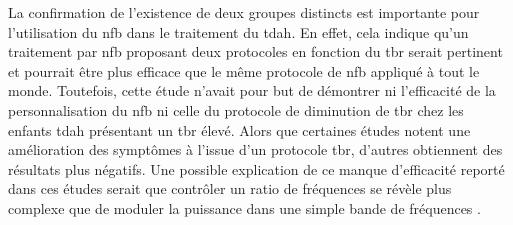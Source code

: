 La confirmation de l'existence de deux groupes distincts est importante pour l'utilisation du \gls{nfb} dans le traitement du \gls{tdah}. En effet, cela indique 
qu'un traitement par \gls{nfb} proposant deux protocoles en fonction du \gls{tbr} serait pertinent et pourrait être plus efficace que le même protocole 
de \gls{nfb} appliqué à tout le monde. Toutefois, cette étude n'avait pour but de démontrer ni l'efficacité de la personnalisation du \gls{nfb} ni celle du protocole de diminution de \gls{tbr} chez les 
enfants \gls{tdah} présentant un \gls{tbr} élevé. Alors que certaines études notent une amélioration des symptômes à l'issue d'un protocole \gls{tbr}, 
d'autres obtiennent des résultats plus négatifs. Une possible explication de ce manque d'efficacité reporté dans ces études serait que contrôler 
un ratio de fréquences se révèle plus complexe que de moduler la puissance dans une simple bande de fréquences \citep{Rogala2016}. 
